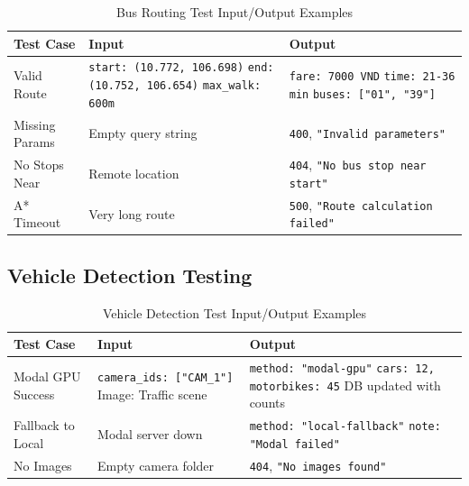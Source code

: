 \begin{table}[H]
    \centering
    \renewcommand{\arraystretch}{1.3}
    \footnotesize
    \begin{tabularx}{\textwidth}{|p{3cm}|p{4.5cm}|X|}
        \hline
        \textbf{Test Case} & \textbf{Input} & \textbf{Output} \\
        \hline
        Valid Route & \texttt{start: (10.772, 106.698)} \newline \texttt{end: (10.752, 106.654)} \newline \texttt{max\_walk: 600m} & \texttt{fare: 7000 VND} \newline \texttt{time: 21-36 min} \newline \texttt{buses: ["01", "39"]} \\
        \hline
        Missing Params & Empty query string & \texttt{400}, \texttt{"Invalid parameters"} \\
        \hline
        No Stops Near & Remote location & \texttt{404}, \texttt{"No bus stop near start"} \\
        \hline
        A* Timeout & Very long route & \texttt{500}, \texttt{"Route calculation failed"} \\
        \hline
    \end{tabularx}
    \caption{Bus Routing Test Input/Output Examples}
\end{table}

\subsection{Vehicle Detection Testing}

\begin{table}[H]
    \centering
    \renewcommand{\arraystretch}{1.3}
    \footnotesize
    \begin{tabularx}{\textwidth}{|p{3cm}|p{4.5cm}|X|}
        \hline
        \textbf{Test Case} & \textbf{Input} & \textbf{Output} \\
        \hline
        Modal GPU Success & \texttt{camera\_ids: ["CAM\_1"]} \newline Image: Traffic scene & \texttt{method: "modal-gpu"} \newline \texttt{cars: 12, motorbikes: 45} \newline DB updated with counts \\
        \hline
        Fallback to Local & Modal server down & \texttt{method: "local-fallback"} \newline \texttt{note: "Modal failed"} \\
        \hline
        No Images & Empty camera folder & \texttt{404}, \texttt{"No images found"} \\
        \hline
    \end{tabularx}
    \caption{Vehicle Detection Test Input/Output Examples}
\end{table}

